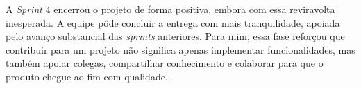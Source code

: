 A \textit{Sprint} 4 encerrou o projeto de forma positiva, embora com essa reviravolta inesperada. A equipe pôde concluir a entrega com mais tranquilidade, apoiada pelo avanço substancial das \textit{sprints} anteriores. Para mim, essa fase reforçou que contribuir para um projeto não significa apenas implementar funcionalidades, mas também apoiar colegas, compartilhar conhecimento e colaborar para que o produto chegue ao fim com qualidade.
